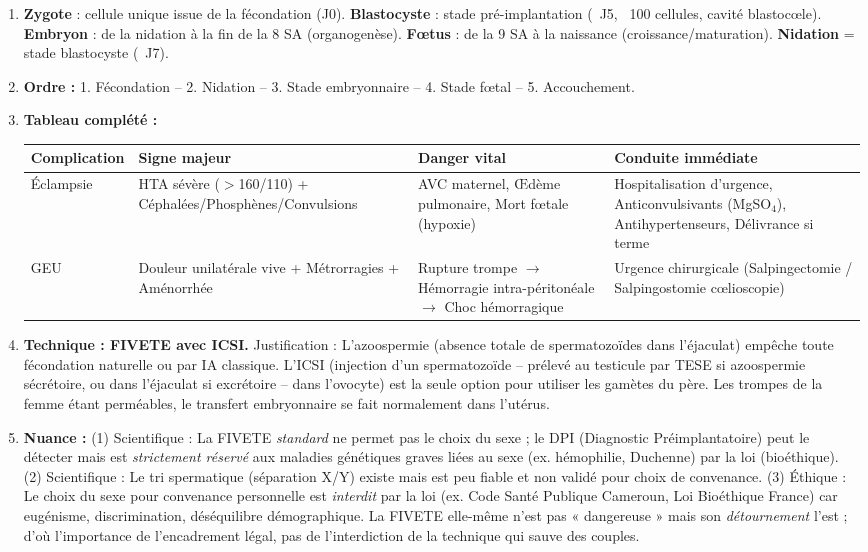 \documentclass[11pt]{article}
\begin{document}
\begin{corrige}
\begin{enumerate}
\item \textbf{Zygote} : cellule unique issue de la fécondation (J0). \textbf{Blastocyste} : stade pré-implantation (~J5, ~100 cellules, cavité blastocœle). \textbf{Embryon} : de la nidation à la fin de la 8\ieme{} SA (organogenèse). \textbf{Fœtus} : de la 9\ieme{} SA à la naissance (croissance/maturation). \textbf{Nidation} = stade blastocyste (~J7).
\item \textbf{Ordre :} 1. Fécondation -- 2. Nidation -- 3. Stade embryonnaire -- 4. Stade fœtal -- 5. Accouchement.
\item \textbf{Tableau complété :}
\begin{center}
\begin{tabularx}{\linewidth}{|l|X|X|X|}
\hline
\rowcolor{popblueL} \textbf{Complication} & \textbf{Signe majeur} & \textbf{Danger vital} & \textbf{Conduite immédiate} \\
\hline
Éclampsie & HTA sévère ($>$160/110) + Céphalées/Phosphènes/Convulsions & AVC maternel, Œdème pulmonaire, Mort fœtale (hypoxie) & Hospitalisation d'urgence, Anticonvulsivants (MgSO$_4$), Antihypertenseurs, Délivrance si terme \\
\hline
GEU & Douleur unilatérale vive + Métrorragies + Aménorrhée & Rupture trompe $\rightarrow$ Hémorragie intra-péritonéale $\rightarrow$ Choc hémorragique & Urgence chirurgicale (Salpingectomie / Salpingostomie cœlioscopie) \\
\hline
\end{tabularx}
\end{center}
\item \textbf{Technique : FIVETE avec ICSI.} Justification : L'azoospermie (absence totale de spermatozoïdes dans l'éjaculat) empêche toute fécondation naturelle ou par IA classique. L'ICSI (injection d'un spermatozoïde -- prélevé au testicule par TESE si azoospermie sécrétoire, ou dans l'éjaculat si excrétoire -- dans l'ovocyte) est la seule option pour utiliser les gamètes du père. Les trompes de la femme étant perméables, le transfert embryonnaire se fait normalement dans l'utérus.
\item \textbf{Nuance :} (1) Scientifique : La FIVETE \emph{standard} ne permet pas le choix du sexe ; le DPI (Diagnostic Préimplantatoire) peut le détecter mais est \emph{strictement réservé} aux maladies génétiques graves liées au sexe (ex. hémophilie, Duchenne) par la loi (bioéthique). (2) Scientifique : Le tri spermatique (séparation X/Y) existe mais est peu fiable et non validé pour choix de convenance. (3) Éthique : Le choix du sexe pour convenance personnelle est \emph{interdit} par la loi (ex. Code Santé Publique Cameroun, Loi Bioéthique France) car eugénisme, discrimination, déséquilibre démographique. La FIVETE elle-même n'est pas « dangereuse » mais son \emph{détournement} l'est ; d'où l'importance de l'encadrement légal, pas de l'interdiction de la technique qui sauve des couples.

\end{enumerate}
\end{corrige}
\end{document}
